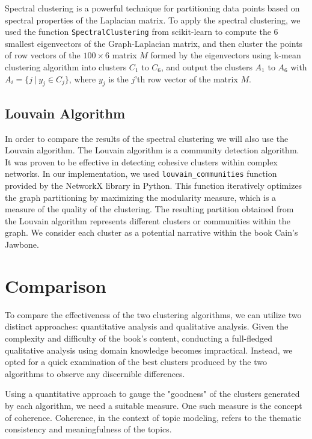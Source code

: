 \documentclass[a4paper]{article}
\begin{document}
Spectral clustering is a powerful technique for partitioning data points based on spectral properties of the Laplacian matrix. To apply the spectral clustering, we used the function \verb|SpectralClustering| from scikit-learn \cite{sklearn} to compute the 6 smallest eigenvectors of the Graph-Laplacian matrix, and then cluster the points of row vectors of the $100 \times 6$ matrix $M$ formed by the eigenvectors using k-mean clustering algorithm into clusters $C_1$ to $C_6$, and output the clusters $A_1$ to $A_6$ with $A_{i} = \{j \ | \ y_{j} \in C_{j}\}$, where $y_{j}$ is the $j$'th row vector of the matrix $M$.

\subsection{Louvain Algorithm}

In order to compare the results of the spectral clustering we will also use the Louvain algorithm. The Louvain algorithm is a community detection algorithm. It was proven to be effective in detecting cohesive clusters within complex networks. In our implementation, we used \verb|louvain_communities| function provided by the NetworkX \cite{networkx} library in Python. This function iteratively optimizes the graph partitioning by maximizing the modularity measure, which is a measure of the quality of the clustering. The resulting partition obtained from the Louvain algorithm represents different clusters or communities within the graph. We consider each cluster as a potential narrative within the book Cain's Jawbone.


\section{Comparison}

To compare the effectiveness of the two clustering algorithms, we can utilize two distinct approaches: quantitative analysis and qualitative analysis. Given the complexity and difficulty of the book's content, conducting a full-fledged qualitative analysis using domain knowledge becomes impractical. Instead, we opted for a quick examination of the best clusters produced by the two algorithms to observe any discernible differences.

Using a quantitative approach to gauge the "goodness" of the clusters generated by each algorithm, we need a suitable measure. One such measure is the concept of coherence. Coherence, in the context of topic modeling, refers to the thematic consistency and meaningfulness of the topics.
\end{document}

